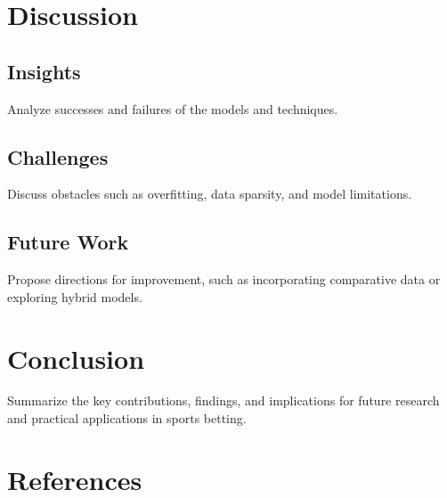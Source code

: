 \documentclass[twocolumn]{article}
\begin{document}
\section{Discussion}
\subsection{Insights}
Analyze successes and failures of the models and techniques.

\subsection{Challenges}
Discuss obstacles such as overfitting, data sparsity, and model limitations.

\subsection{Future Work}
Propose directions for improvement, such as incorporating comparative data or exploring hybrid models.

\section{Conclusion}
Summarize the key contributions, findings, and implications for future research and practical applications in sports betting.

\section*{References}


\end{document}
